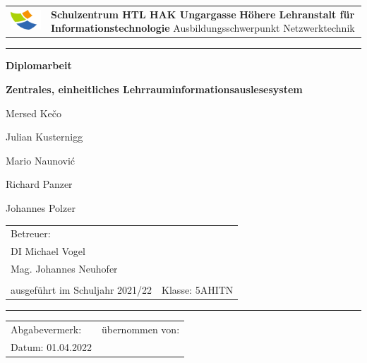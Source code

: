 
\begin{titlepage}
    \begin{tabular}{p{2.5cm}p{}}
        \vspace{0mm}
        \includegraphics[width=3cm]{media/szu_logo.png} &
        \centering
        {\Large \textbf{Schulzentrum HTL HAK Ungargasse} \vspace{5mm}} \newline
        \textbf{Höhere Lehranstalt für Informationstechnologie} \newline
        Ausbildungsschwerpunkt Netzwerktechnik 
        \end{tabular}
        \vspace{5mm}
        \hrule
    \begin{center}
    \vspace{15mm}
    \begin{huge}
        \textbf{Diplomarbeit}
        \vspace{8mm}

        \begin{onehalfspace}
            \textbf{Zentrales, einheitliches Lehrraum\-informations\-auslesesystem}
        \end{onehalfspace}
    \end{huge}
    \vspace{1cm}
    \begin{large}
        Mersed Kečo

        Julian Kusternigg
        
        Mario Naunović
        
        Richard Panzer
        
        Johannes Polzer
    \end{large}
\end{center}
\vfill
\begin{tabular}{p{}l}
    Betreuer: & \\
    
    {\large DI Michael Vogel} & \\
    {\large Mag. Johannes Neuhofer} & \\\\
    ausgeführt im Schuljahr 2021/22 & Klasse: 5AHITN \\

\end{tabular}
\vspace{1cm}
\hrule
    \begin{tabular}{p{}l}
        
        Abgabevermerk: &übernommen von:\\     
        
        Datum: 01.04.2022 & 
    \end{tabular}
\end{titlepage}